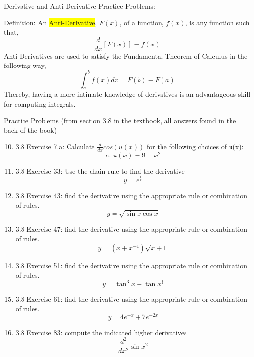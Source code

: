 \documentclass[11pt]{article}
\begin{document}
\pagebreak


Derivative and Anti-Derivative Practice Problems: 

Definition: An \colorbox{yellow}{Anti-Derivative}, $F(x)$, of a function, $f(x)$, is any function such that, 
\[
\frac{d}{dx} [F(x)] = f(x)
\]
Anti-Derivatives are used to satisfy the Fundamental Theorem of Calculus in the following way,
\[
\int_a^bf(x)dx = F(b) - F(a)
\]
Thereby, having a more intimate knowledge of derivatives is an advantageous skill for computing integrals. 

Practice Problems (from section 3.8 in the textbook, all answers found in the back of the book)

\begin{enumerate}
\setcounter{enumi}{9}
\item 
3.8 Exercise 7.a: Calculate $\frac{d}{dx}cos(u(x))$ for the following choices of u(x):
\[
\text{a. } u(x) = 9 - x^2
\] 

\item 
3.8 Exercise 33: Use the chain rule to find the derivative
\[
    y = e^\frac{1}{x}
\]

\item 
3.8 Exercise 43: find the derivative using the appropriate rule or combination of rules. 
\[
y = \sqrt{\sin{x}\cos{x}}
\]

\item 
3.8 Exercise 47: find the derivative using the appropriate rule or combination of rules.
\[
y = (x + x^{-1})\sqrt{x + 1}
\]

\item 
3.8 Exercise 51: find the derivative using the appropriate rule or combination of rules.
\[
y = \tan^3{x} + \tan{x^3}
\]

\item 
3.8 Exercise 61: find the derivative using the appropriate rule or combination of rules.
\[
y = 4e^{-x} + 7e^{-2x}
\]

\item
3.8 Exercise 83: compute the indicated higher derivatives
\[
\frac{d^2}{dx^2}\sin{x^2}
\]
\end{enumerate}

%
\end{document}
